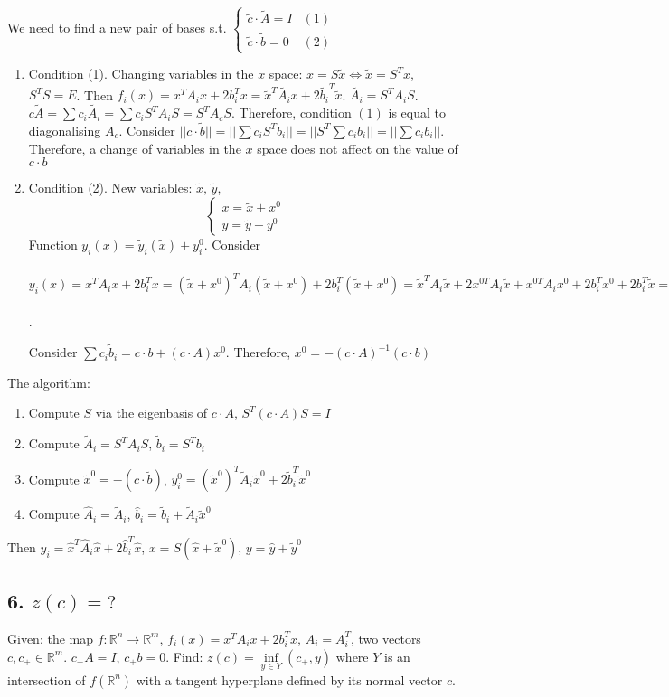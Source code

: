 \documentclass[a4paper]{article}
\begin{document}
We need to find a new pair of bases s.t. $\begin{cases}
\tilde{c}\cdot \tilde{A}=I & (1)\\
\tilde{c}\cdot \tilde{b}=0 & (2)
\end{cases}$
\begin{enumerate}
\item Condition (1). Changing variables in the $x$ space: $x=S\tilde{x}\Leftrightarrow \tilde{x}=S^Tx$, $S^TS=E$. Then $f_i(x)=x^TA_ix+2b_i^Tx=\tilde{x}^T\tilde{A_i}x+2\tilde{b_i}^T\tilde{x}$. $\tilde{A_i}=S^TA_iS$. $c\tilde{A}=\sum c_i\tilde{A_i}=\sum\limits c_iS^TA_iS=S^TA_cS$. Therefore, condition $(1)$ is equal to diagonalising $A_c$. Consider $||c\cdot \tilde{b}||=||\sum c_iS^Tb_i||=||S^T\sum c_ib_i||=||\sum c_ib_i||$. Therefore, a change of variables in the $x$ space does not affect on the value of $c\cdot b$
\item Condition (2). New variables: $\tilde{x},\,\tilde{y}$,
$$\begin{cases}
x=\tilde{x}+x^0\\
y=\tilde{y}+y^0
\end{cases}$$
Function $y_i(x)=\tilde{y}_i(\tilde{x})+y^0_i$. Consider $y_i(x)=x^TA_ix+2b_i^Tx=(\tilde{x}+x^0)^TA_i(\tilde{x}+x^0)+2b_i^T(\tilde{x}+x^0)=\tilde{x}^TA_i\tilde{x}+2x^{0T}A_i\tilde{x}+x^{0T}A_ix^0+2b_i^Tx^0+2b_i^T\tilde{x}=\tilde{x}^TA_i\tilde{x}+2(\underbrace{b_i+A_ix^0}_{\tilde{b}_i})^T\tilde{x}+\underbrace{x^{0T}A_ix^0+2b_i^Tx^0}_{y^0_i}$.

Consider $\sum c_i\tilde{b}_i=c\cdot b +(c\cdot A)x^0$. Therefore, $x^0=-(c\cdot A)^{-1}(c\cdot b)$
\end{enumerate}

The algorithm:
\begin{enumerate}
\item Compute $S$ via the eigenbasis of $c\cdot A$, $S^T(c\cdot A)S=I$
\item Compute $\tilde{A}_i=S^TA_iS$, $\tilde{b}_i=S^Tb_i$
\item Compute $\tilde{x}^0=-(c\cdot \tilde{b})$, $y^0_i=(\tilde{x}^0)^T\tilde{A}_i\tilde{x}^0+2\tilde{b}_i^T\tilde{x}^0$
\item Compute $\hat{A}_i=\tilde{A}_i$, $\hat{b}_i=\tilde{b}_i+\tilde{A}_i\tilde{x}^0$
\end{enumerate}
Then $\hat{y}_i=\hat{x}^T\hat{A}_i\hat{x}+2\hat{b}_i^T\hat{x}$, $x=S(\hat{x}+\tilde{x}^0)$, $y=\hat{y}+\tilde{y}^0$
\subsection*{6. $z(c)=?$}
Given: the map $f\colon\mathbb{R}^n\to\mathbb{R}^m$, $f_i(x)=x^TA_ix+2b_i^Tx$, $A_i=A_i^T$, two vectors $c,c_+\in\mathbb{R}^m$. $c_+A=I$, $c_+b=0$.
Find: $z(c)=\inf\limits_{y\in Y} (c_+, y)$ where $Y$ is an intersection of $f(\mathbb{R}^n)$ with a tangent hyperplane defined by its normal vector $c$.
\end{document}
